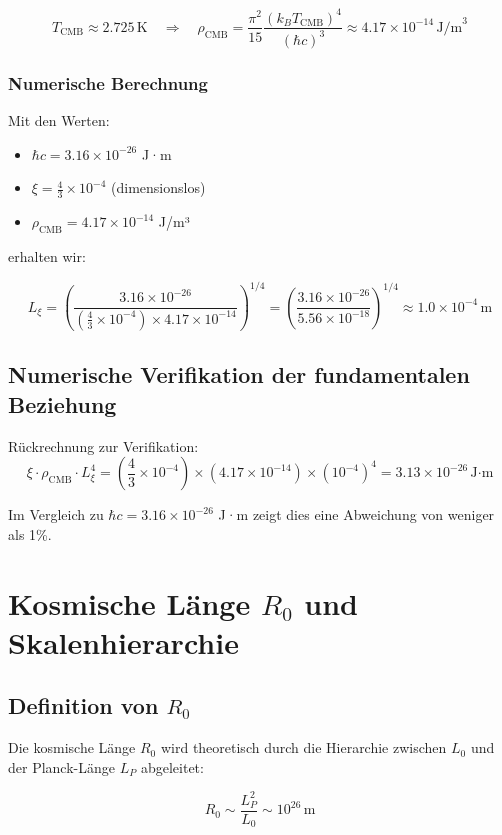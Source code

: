 \documentclass[12pt,a4paper]{article}
\numberwithin{equation}{section}
\begin{document}
	\[
	T_{\text{CMB}} \approx 2.725\,\text{K} \quad \Rightarrow \quad \rho_{\text{CMB}} = \frac{\pi^2}{15} \frac{(k_B T_{\text{CMB}})^4}{(\hbar c)^3} \approx 4.17 \times 10^{-14}\, \text{J/m}^3
	\]
	
	\subsubsection{Numerische Berechnung}
	
	Mit den Werten:
	\begin{itemize}
		\item $\hbar c = 3.16 \times 10^{-26}$ J·m
		\item $\xi = \frac{4}{3} \times 10^{-4}$ (dimensionslos)
		\item $\rho_{\text{CMB}} = 4.17 \times 10^{-14}$ J/m³
	\end{itemize}
	
	erhalten wir:
	
	\[
	L_\xi = \left(\frac{3.16 \times 10^{-26}}{(\frac{4}{3} \times 10^{-4}) \times 4.17 \times 10^{-14}}\right)^{1/4} = \left(\frac{3.16 \times 10^{-26}}{5.56 \times 10^{-18}}\right)^{1/4} \approx 1.0 \times 10^{-4}\,\text{m}
	\]
	
	\subsection{Numerische Verifikation der fundamentalen Beziehung}
	
	Rückrechnung zur Verifikation:
	\[
	\xi \cdot \rho_{\text{CMB}} \cdot L_\xi^4 = \left(\frac{4}{3} \times 10^{-4}\right) \times \left(4.17 \times 10^{-14}\right) \times (10^{-4})^4 = 3.13 \times 10^{-26}\,\text{J·m}
	\]
	
	Im Vergleich zu $\hbar c = 3.16 \times 10^{-26}$ J·m zeigt dies eine Abweichung von weniger als 1\%.
	
	\section{Kosmische Länge $R_0$ und Skalenhierarchie}
	
	\subsection{Definition von $R_0$}
	
	Die kosmische Länge $R_0$ wird theoretisch durch die Hierarchie zwischen $L_0$ und der Planck-Länge $L_P$ abgeleitet:
	
	\[
	R_0 \sim \frac{L_P^2}{L_0} \sim 10^{26}\,\text{m}
	\]
	
\end{document}
